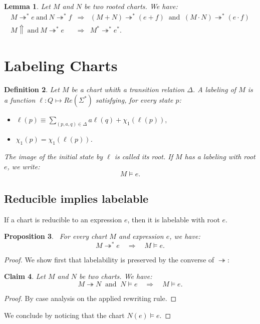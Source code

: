 \documentclass{article}
\newtheorem{definition}{Definition}[section]
\newtheorem{lemma}[definition]{Lemma}
\newtheorem{proposition}[definition]{Proposition}
\newtheorem{claim}[definition]{Claim}
\begin{document}





\begin{lemma} Let $M$ and $N$ be two rooted charts. We have:
  $$\begin{array}{rcl}
    M\twoheadrightarrow^* e\ \text{and}\ N\twoheadrightarrow^* f & \Longrightarrow&  (M+N) \twoheadrightarrow^* (e+f)\ \text{ and }\ (M \cdot N) \twoheadrightarrow^* (e \cdot f)\\[6pt]
    M \Uparrow\ \text{and}\ M \twoheadrightarrow^* e & \Longrightarrow&  M^* \twoheadrightarrow^* e^*.
  \end{array}$$
\end{lemma}

\section{Labeling Charts}

\begin{definition} Let $M$ be a chart whith a transition relation  $\Delta$. A \emph{labeling} of $M$ is a function 
$\ell:Q \mapsto Re(\Sigma^*)$ satisfying, for every state $p$:
\begin{itemize}
\item $\ell(p)\equiv\underset{(p,a, q) \in \Delta}{\sum} a \ell(q) + \chi_1(\ell(p)),$
\item $\chi_1(p) = \chi_1(\ell(p) )$.
\end{itemize}
The image of the initial state by $\ell$ is called its root. If $M$ has a labeling with root $e$, we write: $$M\models e.$$
\end{definition}






 \subsection{Reducible implies labelable}
If a chart is reducible to an expression $e$, then it is labelable with root $e$.
 \begin{proposition}~\label{prop:reducible-implies-decorable}
    For every chart $M$ and expression $e$, we have:
    $$ M\twoheadrightarrow^* e \quad \Longrightarrow \quad M \models e.$$
 \end{proposition}
\begin{proof} We show first that labelability is preserved by the converse of $\twoheadrightarrow$:
     \begin{claim}
     Let $M$ and $N$ be two charts. We have:
     $$ M\twoheadrightarrow N \ \text{ and }\ N \models e \quad \Longrightarrow \quad M \models e. $$
      \end{claim}
      \begin{proof}
        By case analysis on the applied rewriting rule.
      \end{proof}
We conclude by noticing that the chart $N(e)\models e$.
    \end{proof}
\end{document}
